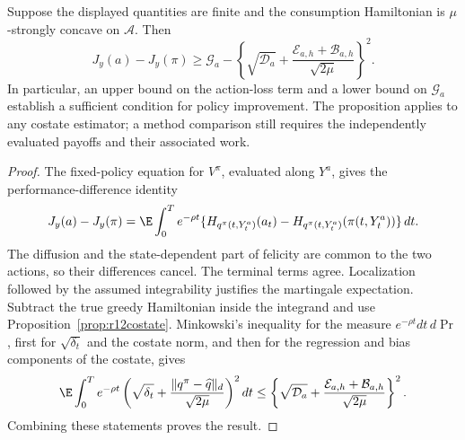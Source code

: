 \begin{proposition}
\label{prop:r14economiccostate}
Suppose the displayed quantities are finite and the consumption
Hamiltonian is $\mu$-strongly concave on $\mathcal A$. Then
\begin{equation}\label{eq:r14economiccostate}
 J_y(a)-J_y(\pi)\geq
 \mathcal G_a-
 \left\{\sqrt{\mathcal D_a}
       +\frac{\mathcal E_{a,h}+\mathcal B_{a,h}}{\sqrt{2\mu}}
 \right\}^{\!2}.
\end{equation}
In particular, an upper bound on the action-loss term and a lower bound
on $\mathcal G_a$ establish a sufficient condition for policy
improvement. The proposition applies to any costate estimator; a
method comparison still requires the independently evaluated payoffs
and their associated work.
\end{proposition}

\begin{proof}
The fixed-policy equation for $V^\pi$, evaluated along $Y^a$, gives
the performance-difference identity
\begin{equation}\label{eq:r14performanceidentity}
 J_y(a)-J_y(\pi)=\E\int_0^T e^{-\rho t}
  \{H_{q^\pi(t,Y_t^a)}(a_t)
       -H_{q^\pi(t,Y_t^a)}(\pi(t,Y_t^a))\}\,dt.
\end{equation}
The diffusion and the state-dependent part of felicity are common to
the two actions, so their differences cancel. The terminal terms agree.
Localization followed by the assumed integrability justifies the
martingale expectation. Subtract the true greedy Hamiltonian inside
the integrand and use Proposition~\ref{prop:r12costate}. Minkowski's
inequality for the measure $e^{-\rho t}dt\,d\Pr$, first for
$\sqrt{\delta_t}$ and the costate norm, and then for the regression
and bias components of the costate, gives
\[
 \E\int_0^T e^{-\rho t}
 \left(\sqrt{\delta_t}+
     \frac{\|q^\pi-\widehat q\|_d}{\sqrt{2\mu}}\right)^2dt
 \leq\left\{\sqrt{\mathcal D_a}+
       \frac{\mathcal E_{a,h}+\mathcal B_{a,h}}{\sqrt{2\mu}}\right\}^2.
\]
Combining these statements proves the result.
\end{proof}

